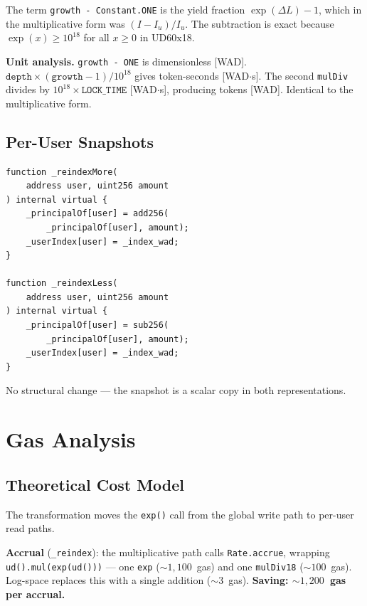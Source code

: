 \documentclass[10pt,a4paper,twocolumn]{article}
\theoremstyle{definition}
\theoremstyle{plain}
\theoremstyle{remark}
\begin{document}
The term \texttt{growth - Constant.ONE} is the yield fraction $\exp(\Delta L) - 1$, which in the multiplicative form was $(I - I_u) / I_u$. The subtraction is exact because $\exp(x) \geq 10^{18}$ for all $x \geq 0$ in UD60x18.

\textbf{Unit analysis.} \texttt{growth - ONE} is dimensionless [WAD]. $\texttt{depth} \times (\texttt{growth} - 1) / 10^{18}$ gives token-seconds [WAD$\cdot$s]. The second \texttt{mulDiv} divides by $10^{18} \times \texttt{LOCK\_TIME}$ [WAD$\cdot$s], producing tokens [WAD]. Identical to the multiplicative form.

\subsection{Per-User Snapshots}
\label{subsec:snapshots}

\begin{lstlisting}[language=Solidity, caption={Snapshot operations (unchanged structure)}, label={lst:reindex-user}]
function _reindexMore(
    address user, uint256 amount
) internal virtual {
    _principalOf[user] = add256(
        _principalOf[user], amount);
    _userIndex[user] = _index_wad;
}

function _reindexLess(
    address user, uint256 amount
) internal virtual {
    _principalOf[user] = sub256(
        _principalOf[user], amount);
    _userIndex[user] = _index_wad;
}
\end{lstlisting}

No structural change --- the snapshot is a scalar copy in both representations.

\section{Gas Analysis}
\label{sec:gas}

\subsection{Theoretical Cost Model}
\label{subsec:gas-theory}

The transformation moves the \texttt{exp()} call from the global write path to per-user read paths.

\textbf{Accrual} (\texttt{\_reindex}): the multiplicative path calls \texttt{Rate.accrue}, wrapping \texttt{ud().mul(exp(ud()))} --- one \texttt{exp} (${\sim}1{,}100$~gas) and one \texttt{mulDiv18} (${\sim}100$~gas). Log-space replaces this with a single addition (${\sim}3$~gas). \textbf{Saving: ${\sim}1{,}200$~gas per accrual.}
\end{document}
